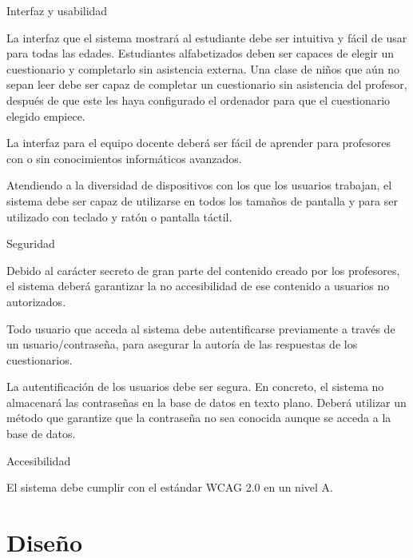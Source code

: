\begin{rnf0}
	\item Interfaz y usabilidad
		\begin{rnf0*}
			\item La interfaz que el sistema mostrará al estudiante debe ser intuitiva y fácil de usar para todas las edades. Estudiantes alfabetizados deben ser capaces de elegir un cuestionario y completarlo sin asistencia externa. Una clase de niños que aún no sepan leer debe ser capaz de completar un cuestionario sin asistencia del profesor, después de que este les haya configurado el ordenador para que el cuestionario elegido empiece.
			\item La interfaz para el equipo docente deberá ser fácil de aprender para profesores con o sin conocimientos informáticos avanzados. 
			\item Atendiendo a la diversidad de dispositivos con los que los usuarios trabajan, el sistema debe ser capaz de utilizarse en todos los tamaños de pantalla y para ser utilizado con teclado y ratón o pantalla táctil.
		\end{rnf0*}
	\item Seguridad
		\begin{rnf0*}
			\item Debido al carácter secreto de gran parte del contenido creado por los profesores, el sistema deberá garantizar la no accesibilidad de ese contenido a usuarios no autorizados.
			\item Todo usuario que acceda al sistema debe autentificarse previamente a través de un usuario/contraseña, para asegurar la autoría de las respuestas de los cuestionarios.
			\item La autentificación de los usuarios debe ser segura. En concreto, el sistema no almacenará las contraseñas en la base de datos en texto plano. Deberá utilizar un método que garantize que la contraseña no sea conocida aunque se acceda a la base de datos.
		\end{rnf0*}
	\item Accesibilidad
		\begin{rnf0*}
			\item El sistema debe cumplir con el estándar \acrshort{WCAG} 2.0 en un nivel A.
		\end{rnf0*}
\end{rnf0}



\section{Diseño}


